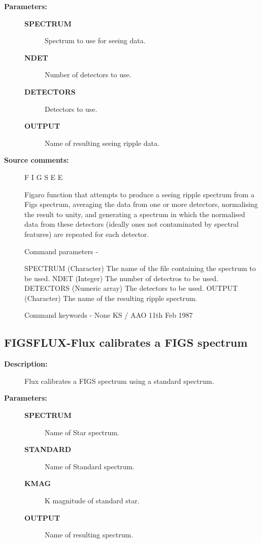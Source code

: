 \begin{description}
\begin{description}
\item [\textbf{Parameters:}]
\begin{description}
\item [\textbf{SPECTRUM}]
 Spectrum to use for seeing data.
\item [\textbf{NDET}]
 Number of detectors to use.
\item [\textbf{DETECTORS}]
 Detectors to use.
\item [\textbf{OUTPUT}]
 Name of resulting seeing ripple data.
\end{description}

\item [\textbf{Source comments:}]
\begin{terminalv}
 F I G S E E

 Figaro function that attempts to produce a seeing ripple spectrum
 from a Figs spectrum, averaging the data from one or more detectors,
 normalising the result to unity, and generating a spectrum in
 which the normalised data from these detectors (ideally ones not
 contaminated by spectral features) are repeated for each detector.

 Command parameters -

 SPECTRUM    (Character) The name of the file containing the
             spectrum to be used.
 NDET        (Integer) The number of detectros to be used.
 DETECTORS   (Numeric array) The detectors to be used.
 OUTPUT      (Character) The name of the resulting ripple spectrum.

 Command keywords -  None
                                              KS / AAO 11th Feb 1987
\end{terminalv}
\end{description}
\subsection{FIGSFLUX-\label{FIGSFLUX}Flux calibrates a FIGS spectrum}
\begin{description}

\item [\textbf{Description:}]
 Flux calibrates a FIGS spectrum using a standard spectrum.

\item [\textbf{Parameters:}]
\begin{description}
\item [\textbf{SPECTRUM}]
 Name of Star spectrum.
\item [\textbf{STANDARD}]
 Name of Standard spectrum.
\item [\textbf{KMAG}]
 K magnitude of standard star.
\item [\textbf{OUTPUT}]
 Name of resulting spectrum.
\end{description}


\end{description}
\end{description}

